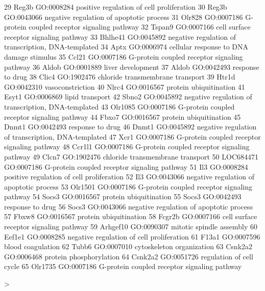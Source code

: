 \documentclass[12pt]{article}
\begin{document}
{\begin{Schunk}
\begin{Soutput}
29       Reg3b GO:0008284           positive regulation of cell proliferation
30       Reg3b GO:0043066            negative regulation of apoptotic process
31      Olr828 GO:0007186        G-protein coupled receptor signaling pathway
32      Tspan9 GO:0007166             cell surface receptor signaling pathway
33     Bhlhe41 GO:0045892 negative regulation of transcription, DNA-templated
34        Aptx GO:0006974            cellular response to DNA damage stimulus
35       Ccl21 GO:0007186        G-protein coupled receptor signaling pathway
36       Aldob GO:0001889                                   liver development
37       Aldob GO:0042493                                    response to drug
38       Clic4 GO:1902476                    chloride transmembrane transport
39       Htr1d GO:0042310                                    vasoconstriction
40       Nlrc4 GO:0016567                              protein ubiquitination
41       Esyt1 GO:0006869                                     lipid transport
42       Sbno2 GO:0045892 negative regulation of transcription, DNA-templated
43     Olr1085 GO:0007186        G-protein coupled receptor signaling pathway
44       Fbxo7 GO:0016567                              protein ubiquitination
45       Dnmt1 GO:0042493                                    response to drug
46       Dnmt1 GO:0045892 negative regulation of transcription, DNA-templated
47        Xcr1 GO:0007186        G-protein coupled receptor signaling pathway
48      Ccr1l1 GO:0007186        G-protein coupled receptor signaling pathway
49       Clcn7 GO:1902476                    chloride transmembrane transport
50   LOC684471 GO:0007186        G-protein coupled receptor signaling pathway
51         Il3 GO:0008284           positive regulation of cell proliferation
52         Il3 GO:0043066            negative regulation of apoptotic process
53     Olr1501 GO:0007186        G-protein coupled receptor signaling pathway
54       Socs3 GO:0016567                              protein ubiquitination
55       Socs3 GO:0042493                                    response to drug
56       Socs3 GO:0043066            negative regulation of apoptotic process
57       Fbxw8 GO:0016567                              protein ubiquitination
58      Fcgr2b GO:0007166             cell surface receptor signaling pathway
59    Arhgef10 GO:0090307                            mitotic spindle assembly
60      Eef1e1 GO:0008285           negative regulation of cell proliferation
61       F13a1 GO:0007596                                   blood coagulation
62       Tubb6 GO:0007010                           cytoskeleton organization
63     Csnk2a2 GO:0006468                             protein phosphorylation
64     Csnk2a2 GO:0051726                            regulation of cell cycle
65     Olr1735 GO:0007186        G-protein coupled receptor signaling pathway
\end{Soutput}
\begin{Sinput}
> 
\end{Sinput}
\end{Schunk}

}
\end{document}
